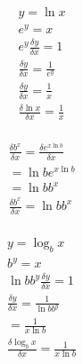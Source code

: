 \documentclass{article}
\begin{document}
	\begin{gather}
		y = \ln x \\
		e^y = x \\
		e^y \frac{\delta y}{\delta x} = 1 \\
		\frac{\delta y}{\delta x} = \frac{1}{e^y} \\
		\frac{\delta y}{\delta x} = \frac{1}{x} \\
		\boxed{\frac{\delta \ln x}{\delta x} = \frac{1}{x}} \nonumber
	\end{gather}
	\\ \setcounter{equation}{0}
	\begin{gather}
		\frac{\delta b^x}{\delta x} = \frac{\delta e^{x\ln b}}{\delta x} \\
		= \ln be^{x\ln b} \\
		= \ln bb^x \\
		\boxed{\frac{\delta b^x}{\delta x} = \ln bb^x} \nonumber
	\end{gather}
	\\ \setcounter{equation}{0}
	\begin{gather}
		y = \log_bx \\
		b^y = x \\
		\ln bb^y\frac{\delta y}{\delta x} = 1 \\
		\frac{\delta y}{\delta x} = \frac{1}{\ln bb^y} \\
		= \frac{1}{x\ln b} \\
		\boxed{\frac{\delta \log_bx}{\delta x} = \frac{1}{x\ln b}} \nonumber
	\end{gather}
\end{document}
